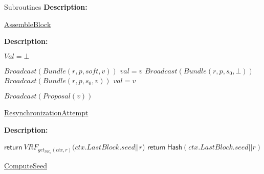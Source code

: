 \documentclass[10pt,a4paper]{article}
\begin{document}
\begin{section}{Subroutines}
\noindent \textbf{Description:}\\


\begin{algorithm}[H]
    \begin{algorithmic}[1]

    \EndFunction
    \end{algorithmic}
    \caption{\underline{AssembleBlock}}
\end{algorithm}

\noindent \textbf{Description:}\\


\begin{algorithm}[H]
    \begin{algorithmic}[1]

    \State $Val = \bot$

        \State $Broadcast(Bundle(r, p, soft, v))$
        \State $val = v$    
        \State $Broadcast(Bundle(r, p, s_0, \bot))$
        \State $Broadcast(Bundle(r, p, s_0, v))$
        \State $val = v$   
    \EndIf

        \State $Broadcast(Proposal(v))$
    \EndIf

    \EndFunction
    \end{algorithmic}
    \caption{\underline{ResynchronizationAttempt}}
\end{algorithm}

\noindent \textbf{Description:}\\


\begin{algorithm}[H]
    \begin{algorithmic}[1]
            \State $\mathsf{return} \ VRF_{get_{SK_a}(ctx, r)}(ctx.LastBlock.seed||r$)
        \Else
            \State $\mathsf{return} \ \mathsf{Hash}(ctx.LastBlock.seed||r)$
        \EndIf
    \EndFunction
    \end{algorithmic}
    \caption{\underline{ComputeSeed}}
\end{algorithm}



\end{section}
\end{document}
